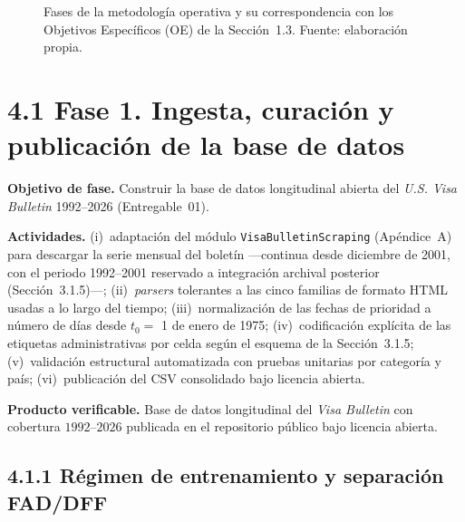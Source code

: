 \documentclass[12pt,letterpaper]{report}
\begin{document}
\begin{figure}[H]
    \caption[Fases de la metodología y su correspondencia con los Objetivos Específicos.]{Fases de la metodología operativa y su correspondencia con los Objetivos Específicos (OE) de la Sección~1.3. Fuente: elaboración propia.}
    \label{fig:metodologia}
\end{figure}

\section{4.1 Fase 1. Ingesta, curación y publicación de la base de datos}

\textbf{Objetivo de fase.} Construir la base de datos longitudinal abierta del \textit{U.S. Visa Bulletin} 1992--2026 (Entregable~01).

\textbf{Actividades.} (i)~adaptación del módulo \texttt{VisaBulletinScraping} (Apéndice~A) para descargar la serie mensual del boletín ---continua desde diciembre de 2001, con el periodo 1992--2001 reservado a integración archival posterior (Sección~3.1.5)---; (ii)~\textit{parsers} tolerantes a las cinco familias de formato HTML usadas a lo largo del tiempo; (iii)~normalización de las fechas de prioridad a número de días desde $t_0 = $ 1 de enero de 1975; (iv)~codificación explícita de las etiquetas administrativas por celda según el esquema de la Sección~3.1.5; (v)~validación estructural automatizada con pruebas unitarias por categoría y país; (vi)~publicación del CSV consolidado bajo licencia abierta.

\textbf{Producto verificable.} Base de datos longitudinal del \textit{Visa Bulletin} con cobertura $1992$--$2026$ publicada en el repositorio público bajo licencia abierta.

\subsection*{4.1.1 Régimen de entrenamiento y separación FAD/DFF}
\end{document}
